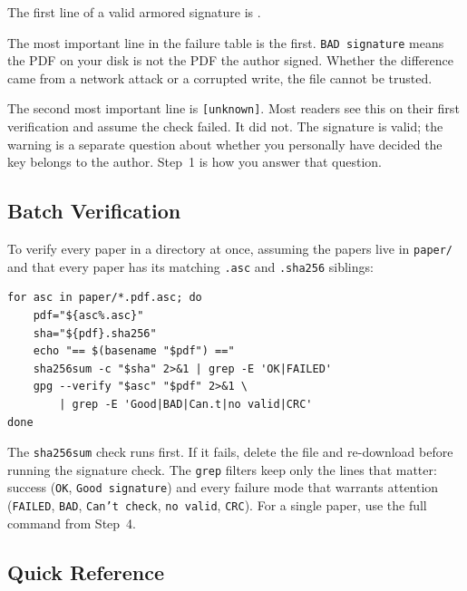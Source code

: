 \par\smallskip
\noindent The first line of a valid armored signature is
	{\small\texttt{}}.
\par\smallskip

The most important line in the failure table is the first.
\texttt{BAD signature} means the PDF on your disk is not the PDF
the author signed. Whether the difference came from a network
attack or a corrupted write, the file cannot be trusted.

The second most important line is \texttt{[unknown]}. Most readers
see this on their first verification and assume the check failed.
It did not. The signature is valid; the warning is a separate
question about whether you personally have decided the key belongs
to the author. Step~1 is how you answer that question.

\subsection*{Batch Verification}

To verify every paper in a directory at once, assuming the papers
live in \texttt{paper/} and that every paper has its matching
\texttt{.asc} and \texttt{.sha256} siblings:

\begin{lstlisting}[style=code]
for asc in paper/*.pdf.asc; do
    pdf="${asc%.asc}"
    sha="${pdf}.sha256"
    echo "== $(basename "$pdf") =="
    sha256sum -c "$sha" 2>&1 | grep -E 'OK|FAILED'
    gpg --verify "$asc" "$pdf" 2>&1 \
        | grep -E 'Good|BAD|Can.t|no valid|CRC'
done
\end{lstlisting}

The \texttt{sha256sum} check runs first. If it fails, delete the
file and re-download before running the signature check. The
\texttt{grep} filters keep only the lines that matter: success
(\texttt{OK}, \texttt{Good signature}) and every failure mode that
warrants attention (\texttt{FAILED}, \texttt{BAD}, \texttt{Can't
	check}, \texttt{no valid}, \texttt{CRC}). For a single paper, use
the full command from Step~4.

\subsection*{Quick Reference}


